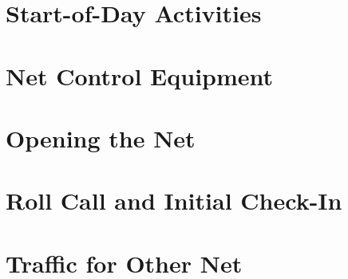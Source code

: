\documentclass[pdflatex,letterpaper,twoside,12pt]{book}
\begin{document}
\iffalse %
Describe role, types of traffic, etc
\fi


\section{Start-of-Day Activities}

\iffalse %
Equipment checks, opening script, etc
...and is this the best placement for this section?
\fi


\section{Net Control Equipment}

\iffalse %
going forward things will be 
color coded.... For example. the Medical Repeater will have a red electrical 
tape ring on the antenna, coax, the radios, etc... (or something similar. they 
will also be labeled with Frequency and use ie: Medical 461.800
\fi %


\section{Opening the Net}


\section{Roll Call and Initial Check-In}


\section{Traffic for Other Net}
\end{document}
